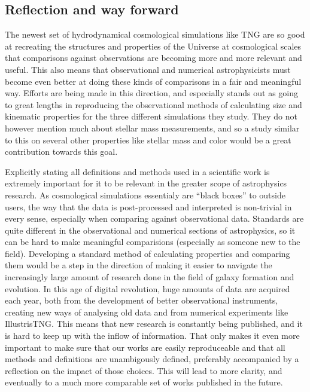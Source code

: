 \subsection{Reflection and way forward}
The newest set of hydrodynamical cosmological simulations like TNG are so good at recreating the structures and properties of the Universe at cosmological scales that comparisons against observations are becoming more and more relevant and useful. This also means that observational and numerical astrophysicists must become even better at doing these kinds of comparisons in a fair and meaningful way. Efforts are being made in this direction, and especially \textcite{Sande2018} stands out as going to great lengths in reproducing the observational methods of calculating size and kinematic properties for the three different simulations they study. They do not however mention much about stellar mass measurements, and so a study similar to this on several other properties like stellar mass and color would be a great contribution towards this goal.

Explicitly stating all definitions and methods used in a scientific work is extremely important for it to be relevant in the greater scope of astrophysics research. As cosmological simulations essentialy are ``black boxes'' to outside users, the way that the data is post-processed and interpreted is non-trivial in every sense, especially when comparing against observational data. Standards are quite different in the observational and numerical sections of astrophysics, so it can be hard to make meaningful comparisions (especially as someone new to the field). Developing a standard method of calculating properties and comparing them would be a step in the direction of making it easier to navigate the increasingly large amount of research done in the field of galaxy formation and evolution. In this age of digital revolution, huge amounts of data are acquired each year, both from the development of better observational instruments, creating new ways of analysing old data and from numerical experiments like IllustrisTNG. This means that new research is constantly being published, and it is hard to keep up with the inflow of information. That only makes it even more important to make sure that our works are easily reproduceable and that all methods and definitions are unambigously defined, preferably accompanied by a reflection on the impact of those choices. This will lead to more clarity, and eventually to a much more comparable set of works published in the future.